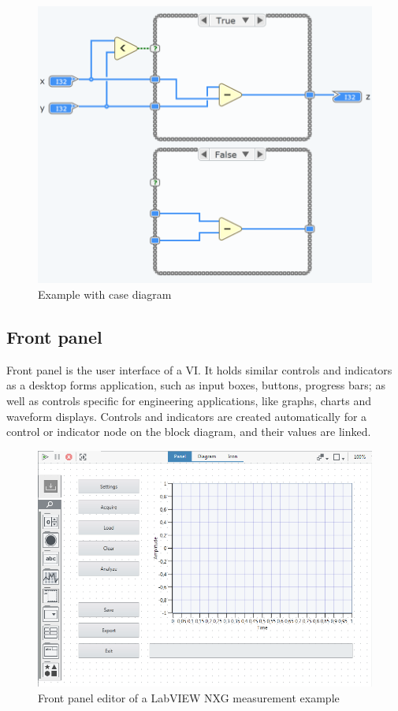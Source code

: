 \begin{figure}
\centering
\includegraphics[width=120mm,keepaspectratio]{figures/examplecase.png}
\caption{Example with case diagram} 
\label{fig:examplecase}
\end{figure}

\subsection{Front panel}
Front panel is the user interface of a VI. It holds similar controls and indicators as a desktop forms application, such as input boxes, buttons, progress bars; as well as controls specific for engineering applications, like graphs, charts and waveform displays. Controls and indicators are  created automatically for a control or indicator node on the block diagram, and their values are linked. 

\begin{figure}
\centering
\includegraphics[width=120mm,keepaspectratio]{figures/frontpanel.png}
\caption{Front panel editor of a LabVIEW NXG measurement example} 
\label{fig:frontpanel}
\end{figure}

